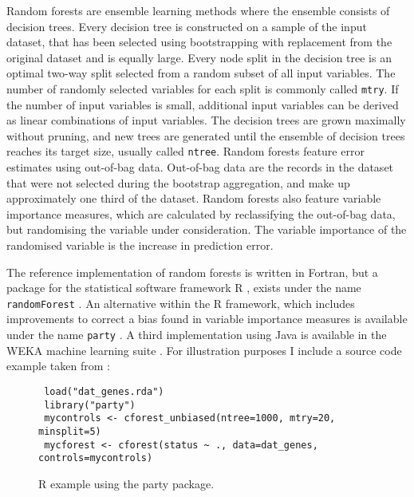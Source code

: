 \documentclass[a4paper,man,12pt,apacite,floatsintext,draftfirst]{apa6} %
\begin{document}
Random forests are ensemble learning methods where the ensemble consists
of decision trees.
Every decision tree is constructed on a sample of the input dataset,
that has been selected using bootstrapping with replacement from the original
dataset and is equally large.
Every node split in the decision tree is an optimal two-way split selected
from a random subset of all input variables.
The number of randomly selected variables for each split is commonly called
\texttt{mtry}.
If the number of input variables is small, additional input variables can be
derived as linear combinations of input variables.
The decision trees are grown maximally without pruning,
and new trees are generated until the ensemble of decision trees reaches its
target size, usually called \texttt{ntree}.
Random forests feature error estimates using out-of-bag data.
Out-of-bag data are the records in the dataset that were not selected during
the bootstrap aggregation, and make up approximately one third of the dataset.
Random forests also feature variable importance measures,
which are calculated by reclassifying the out-of-bag data,
but randomising the variable under consideration.
The variable importance of the randomised variable is the increase in
prediction error.

The reference implementation of random forests is written in Fortran,
but a package for the statistical software framework R \cite{rproject2012},
exists under the name \texttt{randomForest} \cite{liaw2002classification}.
An alternative within the R framework, which includes improvements
to correct a bias found in variable
importance measures is available under the name \texttt{party}
\cite{strobl2008conditional}.
A third implementation using Java is available in the WEKA machine learning
suite \cite{hall2009weka}.
For illustration purposes I include a source code example taken from
:

\begin{figure}[H]
\caption{R example using the party package.}
\begin{verbatim}
 load("dat_genes.rda")
 library("party")
 mycontrols <- cforest_unbiased(ntree=1000, mtry=20, minsplit=5)
 mycforest <- cforest(status ~ ., data=dat_genes, controls=mycontrols)
\end{verbatim}
\end{figure}
\end{document}
